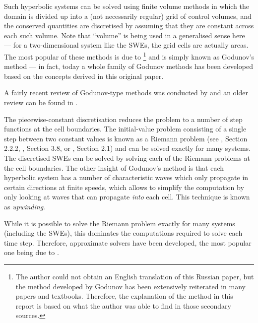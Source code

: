 Such hyperbolic systems can be solved using finite volume methods in which the domain is divided up into a (not necessarily regular) grid of control volumes, and the conserved quantities are discretised by assuming that they are constant across each such volume. Note that ``volume'' is being used in a generalised sense here --- for a two-dimensional system like the SWEs, the grid cells are actually areas. The most popular of these methods is due to \citet{godunov1959difference}\footnote{The author could not obtain an English translation of this Russian paper, but the method developed by Godunov has been extensively reiterated in many papers and textbooks. Therefore, the explanation of the method in this report is based on what the author was able to find in those secondary sources.} and is simply known as Godunov's method --- in fact, today a whole family of Godunov methods has been developed based on the concepts derived in this original paper.

A fairly recent review of Godunov-type methods was conducted by \citet{toro2007godunov} and an older review can be found in \citet{sweby2001godunov}.

The piecewise-constant discretisation reduces the problem to a number of step functions at the cell boundaries. The initial-value problem consisting of a single step between two constant values is known as a Riemann problem (see \citet{toro1999riemann}, Section 2.2.2, \citet{leveque2002finite}, Section 3.8, or \citet{toro2007godunov}, Section 2.1) and can be solved exactly for many systems. The discretised SWEs can be solved by solving each of the Riemann problems at the cell boundaries. The other insight of Godunov's method is that each hyperbolic system has a number of characteristic waves which only propagate in certain directions at finite speeds, which allows to simplify the computation by only looking at waves that can propagate \emph{into} each cell. This technique is known as \emph{upwinding}.

While it is possible to solve the Riemann problem exactly for many systems (including the SWEs), this dominates the computations required to solve each time step. Therefore, approximate solvers have been developed, the most popular one being due to \citet{roe1981approximate}.

